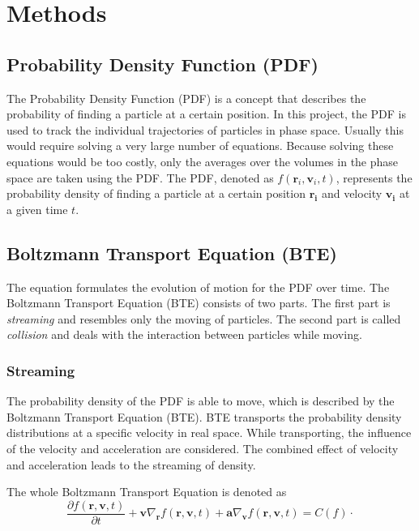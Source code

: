 \chapter{Methods}


\section{Probability Density Function (PDF)}
The Probability Density Function (PDF) is a concept that describes the probability of finding a particle at a certain position.
In this project, the PDF is used to track the individual trajectories of particles in phase space.
Usually this would require solving a very large number of equations.
Because solving these equations would be too costly, only the averages over the volumes in the phase space are taken using the PDF\@.
The PDF, denoted as \(f(\mathbf r_i,\mathbf v_i,t)\), represents the probability density of finding a particle at a certain position \(\mathbf{r_i}\) and velocity \(\mathbf{v_i}\) at a given time \(t\).


\section{Boltzmann Transport Equation (BTE)}
The equation formulates the evolution of motion for the PDF over time.
The Boltzmann Transport Equation (BTE) consists of two parts.
The first part is \textit{streaming} and resembles only the moving of particles.
The second part is called \textit{collision} and deals with the interaction between particles while moving.

\subsection{Streaming}\label{subsec:streaming}
The probability density of the PDF is able to move, which is described by the Boltzmann Transport Equation (BTE).
BTE transports the probability density distributions at a specific velocity in real space.
While transporting, the influence of the velocity and acceleration are considered.
The combined effect of velocity and acceleration leads to the streaming of density.
\newline

The whole Boltzmann Transport Equation is denoted as
\begin{equation}
    \frac{\partial f\left(\mathbf{r},\mathbf{v},t\right)}{\partial t}+\mathbf{v}\nabla_{\mathbf{r}} f\left(\mathbf{r},\mathbf{v},t\right)
    +\mathbf{a}\nabla_{\mathbf{v}} f\left(\mathbf{r},\mathbf{v},t\right)=C(f)
    \cdot
    \label{eq:bte}
\end{equation}

